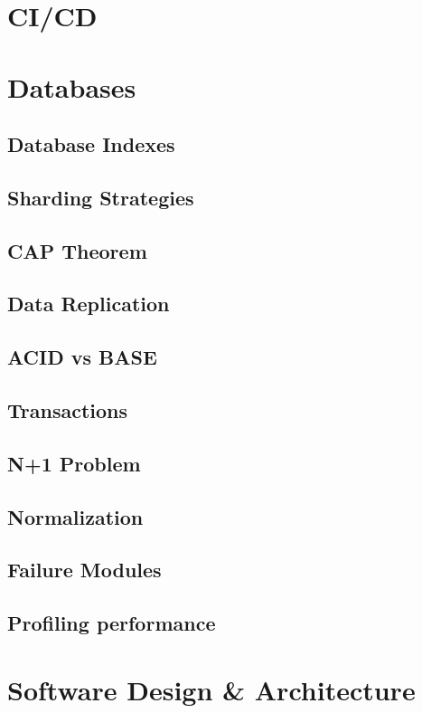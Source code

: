 \documentclass[a4paper]{article}
\begin{document}
    \newpage
    \section{CI/CD}
    
    \newpage
    \section{Databases}
    \subsection{Database Indexes}
    \subsection{Sharding Strategies}
    \subsection{CAP Theorem}
    \subsection{Data Replication}
    \subsection{ACID vs BASE}
    \subsection{Transactions}
    \subsection{N+1 Problem}
    \subsection{Normalization}
    \subsection{Failure Modules}
    \subsection{Profiling performance}
    
    
    \newpage
    \section{Software Design \& Architecture}
\end{document}
